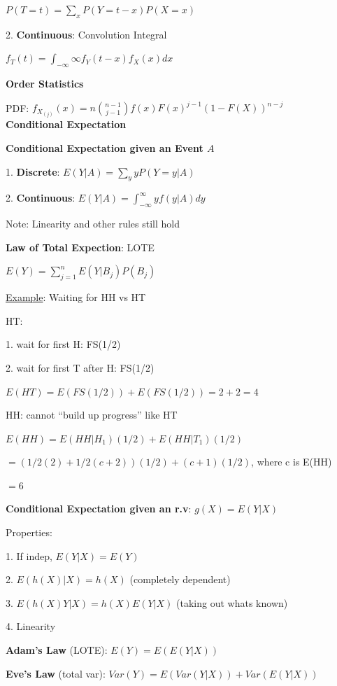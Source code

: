 \documentclass[10pt, a4paper]{article}
\newcommand{\red}[1]{{\color{red}#1}}
\newcommand{\header}[1]{{\normalsize\textbf{#1}}}
\begin{document}
\begin{multicols*}{3}
		\centerline{$P(T = t) = \sum_{x} P(Y = t - x)P(X = x)$}

		2. \textbf{Continuous}: Convolution Integral

		\centerline{$f_T(t) = \int_{-\infty}{\infty} f_Y(t - x) f_X(x) dx$}
		
		\header{Order Statistics}

		PDF: $f_{X_{(j)}}(x) = n \binom{n-1}{j - 1} f(x)F(x)^{j-1}(1 - F(X))^{n - j}$\\

		\header{Conditional Expectation}

		\textbf{Conditional Expectation given an Event $A$}

		1. \textbf{Discrete}: $E(Y|A) = \sum_y yP(Y = y | A)$

		2. \textbf{Continuous}: $E(Y|A) = \int_{-\infty}^{\infty} y f(y|A) dy$

		\red{Note}: Linearity and other rules still hold

		\textbf{Law of Total Expection}: LOTE

		\centerline{$E(Y) = \sum_{j = 1}^n E(Y|B_j)P(B_j)$}

		\underline{Example}: Waiting for HH vs HT

		HT:

		1. wait for first H: FS(1/2)

		2. wait for first T after H: FS(1/2)

		$E(HT) = E(FS(1/2)) + E(FS(1/2)) = 2 + 2 = 4$

		HH: cannot ``build up progress'' like HT
		
		$E(HH) = E(HH | H_1)(1/2) + E(HH | T_1)(1/2)$

		$= (1/2(2) + 1/2(c + 2))(1/2) + (c + 1)(1/2)$, where c is E(HH)

		$=6$

		\textbf{Conditional Expectation given an r.v}: $g(X) = E(Y | X)$

		Properties:

		1. If indep, $E(Y|X) = E(Y)$

		2. $E(h(X)| X) = h(X)$ (completely dependent)

		3. $E(h(X)Y | X) = h(X)E(Y|X)$ (taking out whats known)

		4. Linearity

		\textbf{Adam's Law} (LOTE): $E(Y) = E(E(Y|X))$

		\textbf{Eve's Law} (total var): $Var(Y) = E(Var(Y|X)) + Var(E(Y|X))$\\


\end{multicols*}
\end{document}
